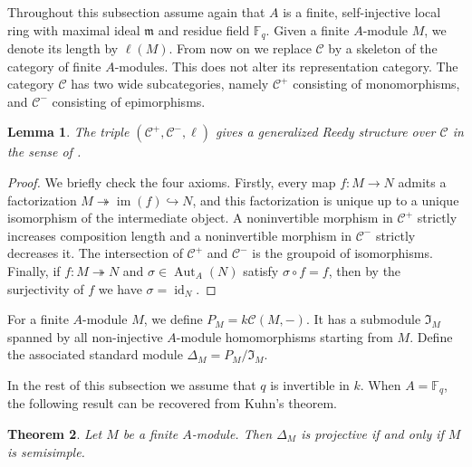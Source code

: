 \documentclass[10pt, reqno]{amsart}
\theoremstyle{plain}
\newtheorem{theorem}{Theorem}[section]
\newtheorem{lemma}[theorem]{Lemma}
\numberwithin{equation}{section}
\theoremstyle{definition}
\newcommand{\Aut}{\operatorname{Aut}}
\newcommand{\id}{\operatorname{id}}
\newcommand{\C}{\mathscr C}
\begin{document}
Throughout this subsection assume again that $A$ is a finite, self-injective local ring with maximal ideal $\mathfrak m$ and residue field $\mathbb{F}_q$. Given a finite $A$-module $M$, we denote its length by $\ell(M)$. From now on we replace $\C$ by a skeleton of the category of finite $A$-modules. This does not alter its representation category. The category $\C$ has two wide subcategories, namely $\C^+$ consisting of monomorphisms, and $\C^-$ consisting of epimorphisms.

\begin{lemma}\label{prop:Reedy}
The triple $(\C^+, \C^-, \ell)$ gives a generalized Reedy structure over $\C$ in the sense of \cite{BM}.
\end{lemma}

\begin{proof}
We briefly check the four axioms. Firstly, every map $f: M \to N$ admits a factorization $M \twoheadrightarrow \operatorname{im}(f) \hookrightarrow N$, and this factorization is unique up to a unique isomorphism of the intermediate object. A noninvertible morphism in $\C^+$ strictly increases composition length and a noninvertible morphism in $\C^-$ strictly decreases it. The intersection of $\C^+$ and $\C^-$ is the groupoid of isomorphisms. Finally, if $f: M \twoheadrightarrow N$ and $\sigma \in \Aut_A(N)$ satisfy $\sigma \circ f = f$, then by the surjectivity of $f$ we have $\sigma = \id_N$.
\end{proof}

For a finite $A$-module $M$, we define $P_M = k\C(M,-)$. It has a submodule $\mathfrak{I}_M$ spanned by all non-injective $A$-module homomorphisms starting from $M$. Define the associated standard module $\Delta_M = P_M / \mathfrak{I}_M$.

In the rest of this subsection we assume that $q$ is invertible in $k$. When $A = \mathbb{F}_q$, the following result can be recovered from Kuhn's theorem.

\begin{theorem}\label{thm:regular-iff-semisimple}
Let $M$ be a finite $A$-module. Then $\Delta_M$ is projective if and only if $M$ is semisimple.
\end{theorem}
\end{document}
